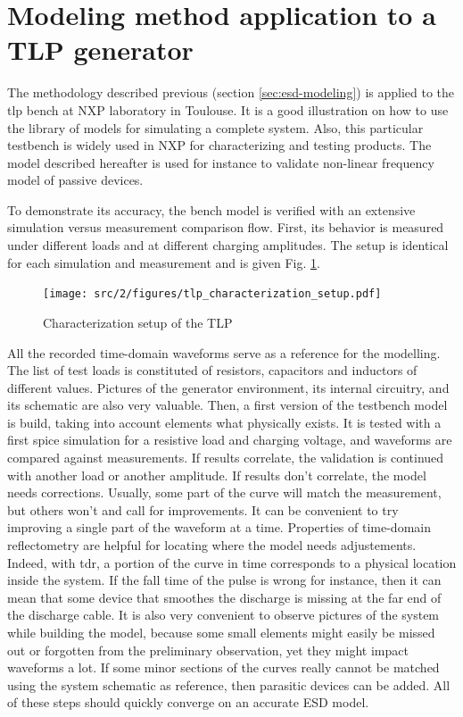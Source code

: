\section{Modeling method application to a TLP generator}
\label{sec:tlp-modeling}

The methodology described previous (section \ref{sec:esd-modeling}) is applied to the \gls{tlp} bench at NXP laboratory in Toulouse.
It is a good illustration on how to use the library of models for simulating a complete system.
Also, this particular testbench is widely used in NXP for characterizing and testing products.
The model described hereafter is used for instance to validate non-linear frequency model of passive devices.

To demonstrate its accuracy, the bench model is verified with an extensive simulation versus measurement comparison flow.
First, its behavior is measured under different loads and at different charging amplitudes.
The setup is identical for each simulation and measurement and is given Fig. \ref{fig:setup-cz-tlp-model}.

\begin{figure}[!h]
  \centering
  \texttt{[image: src/2/figures/tlp\_characterization\_setup.pdf]}
  \caption{Characterization setup of the TLP}
  \label{fig:setup-cz-tlp-model}
\end{figure}

All the recorded time-domain waveforms serve as a reference for the modelling.
The list of test loads is constituted of resistors, capacitors and inductors of different values.
Pictures of the generator environment, its internal circuitry, and its schematic are also very valuable.
Then, a first version of the testbench model is build, taking into account elements what physically exists.
It is tested with a first \gls{spice} simulation for a resistive load and charging voltage, and waveforms are compared against measurements.
If results correlate, the validation is continued with another load or another amplitude.
If results don't correlate, the model needs corrections.
Usually, some part of the curve will match the measurement, but others won't and call for improvements.
It can be convenient to try improving a single part of the waveform at a time.
Properties of time-domain reflectometry are helpful for locating where the model needs adjustements.
Indeed, with \gls{tdr}, a portion of the curve in time corresponds to a physical location inside the system.
If the fall time of the pulse is wrong for instance, then it can mean that some device that smoothes the discharge is missing at the far end of the discharge cable.
It is also very convenient to observe pictures of the system while building the model, because some small elements might easily be missed out or forgotten from the preliminary observation, yet they might impact waveforms a lot.
If some minor sections of the curves really cannot be matched using the system schematic as reference, then parasitic devices can be added.
All of these steps should quickly converge on an accurate ESD model.

